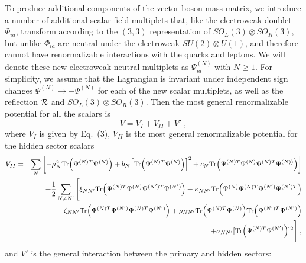 \documentclass[12pt]{article}
\begin{document}
To produce additional components of the vector boson mass matrix, we   introduce  a number of  additional scalar field multiplets   that, like the electroweak doublet $\Phi_{ia}$, transform according to the $(3,3)$ representation of $SO_L(3)\otimes  SO_R(3)$, but unlike $\Phi_{ia}$ are neutral under the electroweak $SU(2)\otimes U(1)$, and therefore cannot have renormalizable interactions with the quarks and leptons.  
We will denote   these new electroweak-neutral multiplets as $\Psi^{(N)}_{ia}$ with $N\geq 1$.  
For simplicity, we assume that the Lagrangian is invariant under independent sign changes $\Psi^{(N)}\rightarrow -\Psi^{(N)}$ for each of the new scalar multiplets, as well as the reflection ${\cal R}$ and $SO_L(3)\otimes  SO_R(3)$.  Then the most general renormalizable potential for all  the scalars is
\begin{equation}
V=V_I+V_{II}+V'\;,
\end{equation}
where $V_I$ is given by Eq.~(3), $V_{II}$ is the most general renormalizable potential for the hidden sector scalars
\begin{eqnarray}
V_{II}=&&\sum_N\left[-\mu_N^2{\rm Tr}\Big(\Psi^{(N)T}\Psi^{(N)}\Big)+b_N\Big[{\rm Tr}\Big(\Psi^{(N)T}\Psi^{(N)}\Big)\Big]^2+c_N{\rm Tr}\Big(\Psi^{(N)T}\Psi^{(N)}\Psi^{(N)T}\Psi^{(N))}\Big)\right]\nonumber\\&&
+\frac{1}{2}\sum_{N\neq N'}\Bigg[\xi_{NN'} {\rm Tr}\Big(\Psi^{(N)T}\Psi^{(N)}\Psi^{(N')T}\Psi^{(N')}\Big)+\kappa_{N N'}{\rm Tr}\Big(\Psi^{(N)}\Psi^{(N)T}\Psi^{(N')}\Psi^{(N')T}\Big)\nonumber\\&&
+\zeta_{N N'} {\rm Tr}\Big(\Psi^{(N)T}\Psi^{(N')}\Psi^{(N)T}\Psi^{(N')}\Big)
+\rho_{N N'} {\rm Tr}\Big(\Psi^{(N)T}\Psi^{(N)}\Big){\rm Tr}\Big(\Psi^{(N')T}\Psi^{(N')}\Big)\nonumber\\&&+\sigma_{N N'} [{\rm Tr}\Big(\Psi^{(N)T}\Psi^{(N')}\Big)]^2\Bigg]\;,
\end{eqnarray}
and $V'$ is  the general interaction between the primary and hidden sectors:
\end{document}
